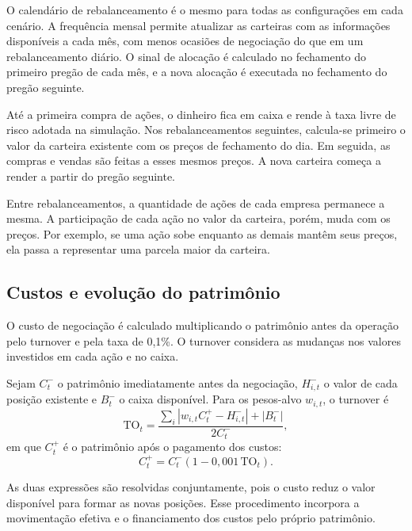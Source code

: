 O calendário de rebalanceamento é o mesmo para todas
as configurações em cada cenário. A frequência mensal permite
atualizar as carteiras com as informações disponíveis a
cada mês, com menos ocasiões de negociação do que em um
rebalanceamento diário. O sinal de alocação é calculado
no fechamento do primeiro pregão de cada mês, e a nova
alocação é executada no fechamento do pregão seguinte.

Até a primeira compra de ações, o dinheiro fica em caixa
e rende à taxa livre de risco adotada na simulação. Nos
rebalanceamentos seguintes, calcula-se primeiro o valor
da carteira existente com os preços de fechamento do
dia. Em seguida, as compras e vendas são feitas a esses
mesmos preços. A nova carteira começa a render a partir
do pregão seguinte.

Entre rebalanceamentos, a quantidade de ações de cada
empresa permanece a mesma. A participação de cada ação
no valor da carteira, porém, muda com os preços. Por
exemplo, se uma ação sobe enquanto as demais mantêm
seus preços, ela passa a representar uma parcela maior
da carteira.

\subsection{Custos e evolução do patrimônio}

O custo de negociação é calculado multiplicando o
patrimônio antes da operação pelo turnover e pela
taxa de 0,1\%. O turnover considera as mudanças
nos valores investidos em cada ação e no caixa.

Sejam $C_t^{-}$ o patrimônio imediatamente antes
da negociação, $H_{i,t}^{-}$ o valor de cada posição
existente e $B_t^{-}$ o caixa disponível. Para os
pesos-alvo $w_{i,t}$, o turnover é
\begin{equation}
\mathrm{TO}_t
=
\frac{
\displaystyle
\sum_i
\left|
w_{i,t}C_t^{+}-H_{i,t}^{-}
\right|
+
|B_t^{-}|
}{
2C_t^{-}
},
\label{eq:turnover_cap4}
\end{equation}
em que $C_t^{+}$ é o patrimônio após o pagamento
dos custos:
\begin{equation}
C_t^{+}
=
C_t^{-}
\left(
1-0,001\,\mathrm{TO}_t
\right).
\label{eq:custo_autofinanciado}
\end{equation}

As duas expressões são resolvidas conjuntamente,
pois o custo reduz o valor disponível para formar
as novas posições. Esse procedimento incorpora
a movimentação efetiva e o financiamento dos custos
pelo próprio patrimônio.

